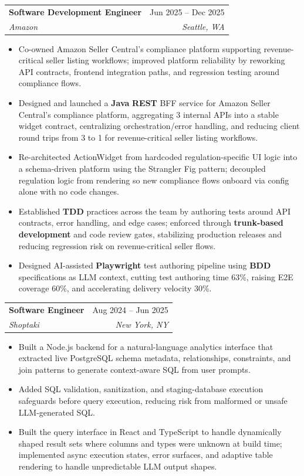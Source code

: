 \documentclass[letterpaper,10.5pt]{article}
\makeatletter
\newcommand{\resumeItem}[1]{
  \item\small{{#1 \vspace{-2pt}}}
}
\newcommand{\resumeSubheading}[4]{
  \vspace{1pt}\item
    \begin{tabular*}{0.97\textwidth}[t]{l@{\extracolsep{\fill}}r}
      \textbf{#1} & #2 \\
      \textit{\small#3} & \textit{\small #4} \\
    \end{tabular*}\vspace{-7pt}
}
\newcommand{\resumeItemListStart}{\begin{itemize}}
\newcommand{\resumeItemListEnd}{\end{itemize}\vspace{-5pt}}
\makeatother
\begin{document}
    \resumeSubheading
      {Software Development Engineer}{Jun 2025 -- Dec 2025}
      {Amazon}{Seattle, WA}
      \resumeItemListStart
        \resumeItem{Co-owned Amazon Seller Central's compliance platform supporting revenue-critical seller listing workflows; improved platform reliability by reworking API contracts, frontend integration paths, and regression testing around compliance flows.}
        \resumeItem{Designed and launched a \textbf{Java} \textbf{REST} BFF service for Amazon Seller Central's compliance platform, aggregating 3 internal APIs into a stable widget contract, centralizing orchestration/error handling, and reducing client round trips from 3 to 1 for revenue-critical seller listing workflows.}
        \resumeItem{Re-architected ActionWidget from hardcoded regulation-specific UI logic into a schema-driven platform using the Strangler Fig pattern; decoupled regulation logic from rendering so new compliance flows onboard via config alone with no code changes.}
        \resumeItem{Established \textbf{TDD} practices across the team by authoring tests around API contracts, error handling, and edge cases; enforced through \textbf{trunk-based development} and code review gates, stabilizing production releases and reducing regression risk on revenue-critical seller flows.}
        \resumeItem{Designed AI-assisted \textbf{Playwright} test authoring pipeline using \textbf{BDD} specifications as LLM context, cutting test authoring time 63\%, raising E2E coverage 60\%, and accelerating delivery velocity 30\%.}
      \resumeItemListEnd
        
      \resumeSubheading
        {Software Engineer}{Aug 2024 -- Jun 2025}
        {Shoptaki}{New York, NY}
          \resumeItemListStart
        \resumeItem{Built a Node.js backend for a natural-language analytics interface that extracted live PostgreSQL schema metadata, relationships, constraints, and join patterns to generate context-aware SQL from user prompts.}
        \resumeItem{Added SQL validation, sanitization, and staging-database execution safeguards before query execution, reducing risk from malformed or unsafe LLM-generated SQL.}
        \resumeItem{Built the query interface in React and TypeScript to handle dynamically shaped result sets where columns and types were unknown at build time; implemented async execution states, error surfaces, and adaptive table rendering to handle unpredictable LLM output shapes.}
      \resumeItemListEnd
\end{document}
